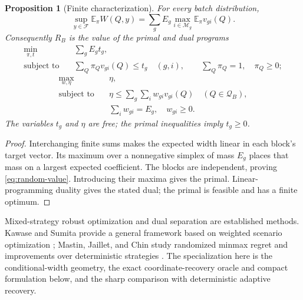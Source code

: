\documentclass[12pt]{article}
\newtheorem{proposition}{Proposition}
\newcommand{\F}{\mathcal{F}}
\newcommand{\M}{\mathcal{M}}
\begin{document}
\begin{proposition}[Finite characterization]
\label{prop:random-finite}
For every batch distribution,
\begin{equation}
 \sup_{y\in\F}\mathbb E_\pi W(Q,y)
 =\sum_g E_g\max_{i\in\M_g}\mathbb E_\pi v_{gi}(Q).
 \label{eq:random-value}
\end{equation}
Consequently $R_B$ is the value of the primal and dual programs
\begin{equation}
 \begin{aligned}
 \min_{\pi,t}\quad &\sum_g E_g t_g,\\
 \text{subject to}\quad
 &\sum_Q\pi_Qv_{gi}(Q)\leq t_g\quad(g,i),\qquad
   \sum_Q\pi_Q=1,\quad\pi_Q\geq0;
 \end{aligned}
 \label{eq:random-primal}
\end{equation}
\begin{equation}
 \begin{aligned}
 \max_{w,\eta}\quad &\eta,\\
 \text{subject to}\quad
 &\eta\leq\sum_g\sum_i w_{gi}v_{gi}(Q)\quad(Q\in\mathcal Q_B),\\
 &\sum_i w_{gi}=E_g,\quad w_{gi}\geq0.
 \end{aligned}
 \label{eq:random-dual}
\end{equation}
The variables $t_g$ and $\eta$ are free; the primal inequalities imply
$t_g\geq0$.
\end{proposition}
\begin{proof}
Interchanging finite sums makes the expected width linear in each
block's target vector. Its maximum over a nonnegative simplex of mass
$E_g$ places that mass on a largest expected coefficient. The blocks are
independent, proving \eqref{eq:random-value}. Introducing their maxima
gives the primal. Linear-programming duality gives the stated dual;
the primal is feasible and has a finite optimum.
\end{proof}

Mixed-strategy robust optimization and dual separation are established
methods. Kawase and Sumita provide a general framework based on weighted
scenario optimization \cite{kawase2024}; Mastin, Jaillet, and Chin study
randomized minmax regret and improvements over deterministic strategies
\cite{mastin2015}. The specialization here is the conditional-width
geometry, the exact coordinate-recovery oracle and compact formulation
below, and the sharp comparison with deterministic adaptive recovery.
\end{document}
